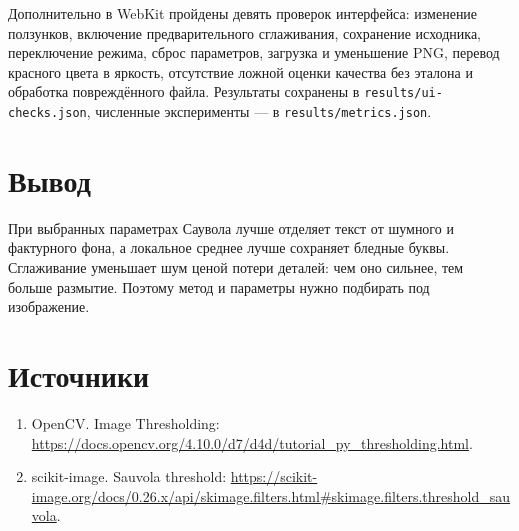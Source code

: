\documentclass[12pt,a4paper]{article}
\begin{document}
Дополнительно в WebKit пройдены девять проверок интерфейса: изменение ползунков, включение предварительного сглаживания, сохранение исходника, переключение режима, сброс параметров, загрузка и уменьшение PNG, перевод красного цвета в яркость, отсутствие ложной оценки качества без эталона и обработка повреждённого файла. Результаты сохранены в \texttt{results/ui-checks.json}, численные эксперименты --- в \texttt{results/metrics.json}.

\section{Вывод}
При выбранных параметрах Саувола лучше отделяет текст от шумного и фактурного фона, а локальное среднее лучше сохраняет бледные буквы. Сглаживание уменьшает шум ценой потери деталей: чем оно сильнее, тем больше размытие. Поэтому метод и параметры нужно подбирать под изображение.

\section*{Источники}
\begin{enumerate}
\item OpenCV. Image Thresholding: \url{https://docs.opencv.org/4.10.0/d7/d4d/tutorial_py_thresholding.html}.
\item scikit-image. Sauvola threshold: \url{https://scikit-image.org/docs/0.26.x/api/skimage.filters.html#skimage.filters.threshold_sauvola}.
\end{enumerate}
\end{document}
